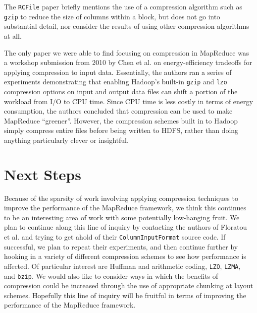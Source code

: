 \documentclass[twocolumn]{article}
\begin{document}
The \verb+RCFile+ paper briefly mentions the use of a compression algorithm
such as \verb+gzip+ to reduce the size of columns within a block, but does
not go into substantial detail, nor consider the results of using other
compression algorithms at all.

The only paper we were able to find focusing on compression in MapReduce
was a workshop submission from 2010 by Chen et al. \cite{ref:energy} on
energy-efficiency tradeoffs for applying compression to input data.
Essentially, the authors ran a series of experiments demonstrating that
enabling Hadoop's built-in \verb+gzip+ and \verb+lzo+ compression options
on input and output data files can shift a portion of the workload
from I/O to CPU time.  Since CPU time is less costly in terms of energy
consumption, the authors concluded that compression can be used to make
MapReduce ``greener''.  However, the compression schemes built in to 
Hadoop simply compress entire files before being written to HDFS, rather
than doing anything particularly clever or insightful.

\section{Next Steps}

Because of the sparsity of work involving applying compression techniques
to improve the performance of the MapReduce framework, we think this continues
to be an interesting area of work with some potentially low-hanging fruit.
We plan to continue along this line of inquiry by contacting the authors
of Floratou et al. and trying to get ahold of their \verb+ColumnInputFormat+
source code.  If successful, we plan to repeat their experiments, and then
continue further by hooking in a variety of different compression schemes
to see how performance is affected.  Of particular interest are Huffman
\cite{ref:huffman} and arithmetic \cite{ref:arith} coding, \verb+LZO+,
\verb+LZMA+, and \verb+bzip+.  We would also like to consider ways in which
the benefits of compression could be increased through the use of
appropriate chunking at layout schemes.  Hopefully this line of inquiry
will be fruitful in terms of improving the performance of the MapReduce
framework.
\end{document}
